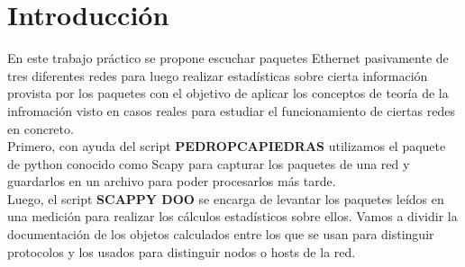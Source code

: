 \section{Introducción}
En este trabajo práctico se propone escuchar paquetes Ethernet pasivamente de tres diferentes redes para luego realizar estadísticas sobre cierta información provista por los paquetes con el objetivo de aplicar los conceptos de teoría de la infromación visto en casos reales para estudiar el funcionamiento de ciertas redes en concreto.\\
Primero, con ayuda del script \textbf{PEDROPCAPIEDRAS} utilizamos el paquete de python conocido como Scapy para capturar los paquetes de una red y guardarlos en un archivo para poder procesarlos más tarde.\\
Luego, el script \textbf{SCAPPY DOO} se encarga de levantar los paquetes leídos en una medición para realizar los cálculos estadísticos sobre ellos. Vamos a dividir la documentación de los objetos calculados entre los que se usan para distinguir protocolos y los usados para distinguir nodos o hosts de la red.\bigskip

